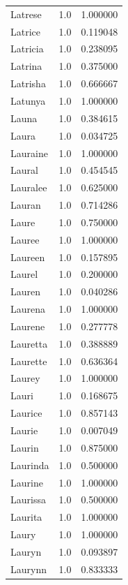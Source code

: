 \documentclass[
  letterpaper,
  DIV=11,
  numbers=noendperiod]{scrreprt}
\begin{document}
\begin{tabular}{lrr}
Latrese         &   1.0 &   1.000000 \\
Latrice         &   1.0 &   0.119048 \\
Latricia        &   1.0 &   0.238095 \\
Latrina         &   1.0 &   0.375000 \\
Latrisha        &   1.0 &   0.666667 \\
Latunya         &   1.0 &   1.000000 \\
Launa           &   1.0 &   0.384615 \\
Laura           &   1.0 &   0.034725 \\
Lauraine        &   1.0 &   1.000000 \\
Laural          &   1.0 &   0.454545 \\
Lauralee        &   1.0 &   0.625000 \\
Lauran          &   1.0 &   0.714286 \\
Laure           &   1.0 &   0.750000 \\
Lauree          &   1.0 &   1.000000 \\
Laureen         &   1.0 &   0.157895 \\
Laurel          &   1.0 &   0.200000 \\
Lauren          &   1.0 &   0.040286 \\
Laurena         &   1.0 &   1.000000 \\
Laurene         &   1.0 &   0.277778 \\
Lauretta        &   1.0 &   0.388889 \\
Laurette        &   1.0 &   0.636364 \\
Laurey          &   1.0 &   1.000000 \\
Lauri           &   1.0 &   0.168675 \\
Laurice         &   1.0 &   0.857143 \\
Laurie          &   1.0 &   0.007049 \\
Laurin          &   1.0 &   0.875000 \\
Laurinda        &   1.0 &   0.500000 \\
Laurine         &   1.0 &   1.000000 \\
Laurissa        &   1.0 &   0.500000 \\
Laurita         &   1.0 &   1.000000 \\
Laury           &   1.0 &   1.000000 \\
Lauryn          &   1.0 &   0.093897 \\
Laurynn         &   1.0 &   0.833333 \\

\end{tabular}
\end{document}
